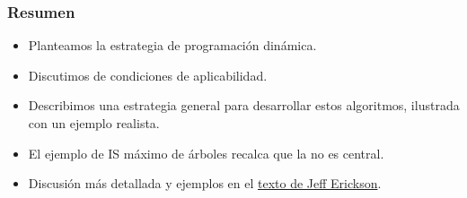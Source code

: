 \documentclass[english, spanish, fleqn,%
hyperref = {colorlinks, urlcolor = blue}%
]{beamer}
\begin{document}
\begin{frame}
  \setcounter{beamerpauses}{2}
  \frametitle{Resumen}

  \begin{itemize}
  \item
    Planteamos la estrategia de programación dinámica.
  \item
    Discutimos de condiciones de aplicabilidad.
  \item
    Describimos una estrategia general para desarrollar estos algoritmos,
    ilustrada con un ejemplo realista.
  \item
    El ejemplo de \textsc{IS} máximo de árboles recalca
    que la  no es central.
  \item
    Discusión más detallada y ejemplos
    en el \href{http://jeffe.cs.illinois.edu/teaching/algorithms}
               {texto de Jeff Erickson}.
  \end{itemize}
\end{frame}
\end{document}
